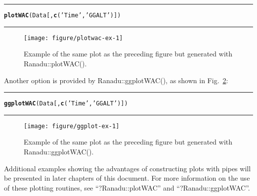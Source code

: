 \documentclass[12pt,english]{report}\usepackage[]{graphicx}\usepackage[]{color}
\makeatletter
\def\maxwidth{ %
  \ifdim\Gin@nat@width>\linewidth
    \linewidth
  \else
    \Gin@nat@width
  \fi
}
\newcommand{\hlstr}[1]{\textcolor[rgb]{0.192,0.494,0.8}{#1}}%
\newcommand{\hlstd}[1]{\textcolor[rgb]{0.345,0.345,0.345}{#1}}%
\newcommand{\hlkwd}[1]{\textcolor[rgb]{0.737,0.353,0.396}{\textbf{#1}}}%
\newenvironment{kframe}{%
 \def\at@end@of@kframe{}%
 \ifinner\ifhmode%
  \def\at@end@of@kframe{\end{minipage}}%
  \begin{minipage}{\columnwidth}%
 \fi\fi%
 \def\FrameCommand##1{\hskip\@totalleftmargin \hskip-\fboxsep
 \colorbox{shadecolor}{##1}\hskip-\fboxsep
     \hskip-\linewidth \hskip-\@totalleftmargin \hskip\columnwidth}%
 \MakeFramed {\advance\hsize-\width
   \@totalleftmargin\z@ \linewidth\hsize
   \@setminipage}}%
 {\par\unskip\endMakeFramed%
 \at@end@of@kframe}
\newenvironment{knitrout}{}{} %
\renewenvironment{kframe}{\vskip0.1in\hrule}{\hrule\vskip0.1in}
\makeatother
\begin{document}
\begin{knitrout}
\color{fgcolor}\begin{kframe}
\begin{alltt}
\hlkwd{plotWAC}\hlstd{(Data[,} \hlkwd{c}\hlstd{(}\hlstr{'Time'}\hlstd{,} \hlstr{'GGALT'}\hlstd{)])}
\end{alltt}
\end{kframe}\begin{figure}

{\centering \texttt{[image: figure/plotwac-ex-1]} 

}

\caption[Example of the same plot as the preceding figure but generated with Ranadu::plotWAC()]{Example of the same plot as the preceding figure but generated with Ranadu::plotWAC().}\label{fig:plotwac-ex}
\end{figure}


\end{knitrout}

Another option is provided by Ranadu::ggplotWAC(), as shown in Fig.~\ref{fig:ggplot-ex}:

\begin{knitrout}
\color{fgcolor}\begin{kframe}
\begin{alltt}
\hlkwd{ggplotWAC}\hlstd{(Data[,} \hlkwd{c}\hlstd{(}\hlstr{'Time'}\hlstd{,} \hlstr{'GGALT'}\hlstd{)])}
\end{alltt}
\end{kframe}\begin{figure}

{\centering \texttt{[image: figure/ggplot-ex-1]} 

}

\caption[Example of the same plot as the preceding figure but generated with Ranadu::ggplotWAC()]{Example of the same plot as the preceding figure but generated with Ranadu::ggplotWAC().}\label{fig:ggplot-ex}
\end{figure}


\end{knitrout}

Additional examples showing the advantages of constructing plots with
pipes will be presented in later chapters of this document. For more
information on the use of these plotting routines, see ``?Ranadu::plotWAC''
and ``?Ranadu::ggplotWAC''.

\pagebreak{}
\end{document}
